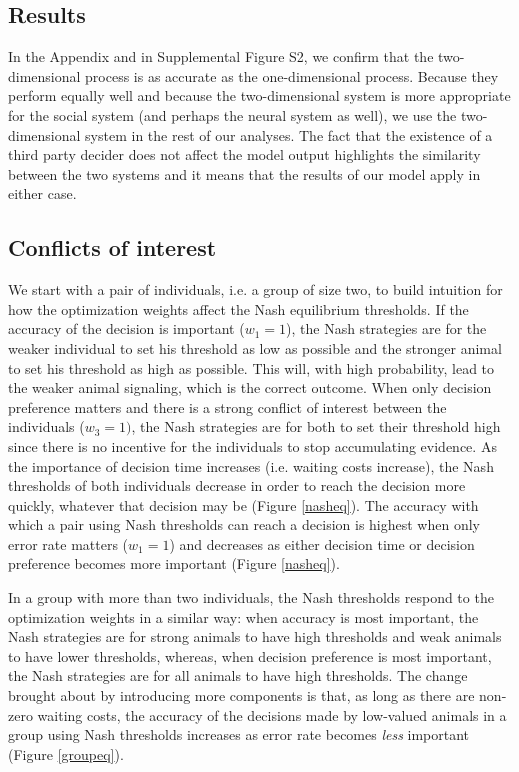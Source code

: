 \documentclass{pnastwo}
\begin{document}
\begin{article}
\section{Results}
In the Appendix and in Supplemental Figure S2, we confirm that the two-dimensional process is as accurate as the one-dimensional process. Because they perform equally well and because the two-dimensional system is more appropriate for the social system (and perhaps the neural system as well), we use the two-dimensional system in the rest of our analyses. The fact that the existence of a third party decider does not affect the model output highlights the similarity between the two systems and it means that the results of our model apply in either case.


\subsection{Conflicts of interest}
We start with a pair of individuals, i.e. a group of size two, to build intuition for how the optimization weights affect the Nash equilibrium thresholds.  If the accuracy of the decision is important ($w_1=1$), the Nash strategies are for the weaker individual to set his threshold as low as possible and the stronger animal to set his threshold as high as possible. This will, with high probability, lead to the weaker animal signaling, which is the correct outcome. When only decision preference matters and there is a strong conflict of interest between the individuals ($w_3=1)$, the Nash strategies are for both to set their threshold high since there is no incentive for the individuals to stop accumulating evidence. As the importance of decision time increases (i.e. waiting costs increase), the Nash thresholds of both individuals decrease in order to reach the decision more quickly, whatever that decision may be (Figure \ref{nasheq}). The accuracy with which a pair using Nash thresholds can reach a decision is highest when only error rate matters ($w_1=1$) and decreases as either decision time or decision preference becomes more important (Figure \ref{nasheq}).  


In a group with more than two individuals, the Nash thresholds respond to the optimization weights in a similar way: when accuracy is most important, the Nash strategies are for strong animals to have high thresholds and weak animals to have lower thresholds, whereas, when decision preference is most important, the Nash strategies are for all animals to have high thresholds. The change brought about by introducing more components is that, as long as there are non-zero waiting costs, the accuracy of the decisions made by low-valued animals in a group using Nash thresholds increases as error rate becomes \emph{less} important (Figure \ref{groupeq}).  


\end{article}
\end{document}
